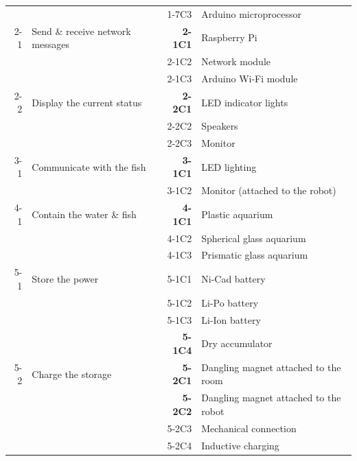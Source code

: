 \documentclass[a4paper, 10pt, DIV=16, parskip = full, twocolumn = false]{scrartcl}
\begin{document}
\begin{table}
\begin{tabular}{rlrl}
		& & 1-7C3 & Arduino microprocessor \\	
		2-1 & Send \& receive network messages & \textbf{2-1C1} & Raspberry Pi \\
		& & 2-1C2 & Network module \\	
		& & 2-1C3 & Arduino Wi-Fi module \\
		2-2 & Display the current status & \textbf{2-2C1} & LED indicator lights\\
		& & 2-2C2 & Speakers \\	
		& & 2-2C3 & Monitor \\	
		3-1 & Communicate with the fish & \textbf{3-1C1} & LED lighting \\
		& & 3-1C2 & Monitor (attached to the robot) \\		
		4-1 & Contain the water \& fish & \textbf{4-1C1} & Plastic aquarium \\
		& & 4-1C2 & Spherical glass aquarium \\	
		& & 4-1C3 & Prismatic glass aquarium \\
		5-1 & Store the power & 5-1C1 & Ni-Cad battery \\
		& & 5-1C2 & Li-Po battery \\	
		& & 5-1C3 & Li-Ion battery \\
		& & \textbf{5-1C4} & Dry accumulator \\	
		5-2 & Charge the storage & \textbf{5-2C1} & Dangling magnet attached to the room \\
		& & \textbf{5-2C2} & Dangling magnet attached to the robot \\	
		& & 5-2C3 & Mechanical connection \\
		& & 5-2C4 & Inductive charging \\
	\bottomrule
	\end{tabular}
\label{table:concepts}
\end{table}
\end{document}
